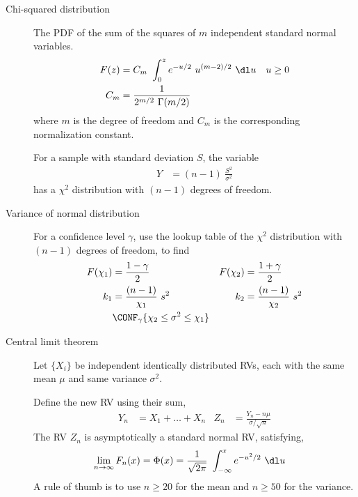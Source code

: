 \begin{description}
    \item[Chi-squared distribution] The PDF of the sum of the squares of $ m $
          independent standard normal variables.
          \begin{align}
              F(z) & = C_m\ \int_{0}^{z} e^{-u/2}\ u^{(m-2)/2}\ \dl u &
              u    & \geq 0                                             \\
              C_m  & = \frac{1}{2^{m/2}\ \Gamma(m/2)}
          \end{align}
          where $ m $ is the degree of freedom and $ C_m $ is the corresponding
          normalization constant. \par
          For a sample with standard deviation $ S $, the variable
          \begin{align}
              Y & = (n-1)\ \frac{S^2}{\sigma^2}
          \end{align}
          has a $ \chi^2 $ distribution with $ (n-1) $ degrees of freedom.

    \item[Variance of normal distribution] For a confidence level $ \gamma $, use the
          lookup table of the $ \chi^2 $ distribution with $ (n-1) $ degrees of freedom,
          to find
          \begin{align}
              F(\chi_1) & = \frac{1-\gamma}{2}                             &
              F(\chi_2) & = \frac{1+\gamma}{2}                               \\
              k_1       & = \frac{(n-1)}{\chi_1}\ s^2                      &
              k_2       & = \frac{(n-1)}{\chi_2}\ s^2                        \\
                        & \CONF_\gamma\{\chi_2 \leq \sigma^2 \leq \chi_1\}
          \end{align}

    \item[Central limit theorem] Let $ \{X_i\} $ be independent identically distributed
          RVs, each with the same mean $ \mu $ and same variance $ \sigma^2 $. \par
          Define the new RV using their sum,
          \begin{align}
              Y_n & = X_1 + \dots + X_n                    &
              Z_n & = \frac{Y_n - n\mu}{\sigma / \sqrt{n}}
          \end{align}
          The RV $ Z_n $ is asymptotically a standard normal RV, satisfying,
          \begin{align}
              \lim_{n \to \infty} F_n(x) & = \Phi(x) = \frac{1}{\sqrt{2\pi}}
              \ \int_{-\infty}^{x} e^{-u^2/2}\ \dl u
          \end{align}
          A rule of thumb is to use $ n \geq 20 $ for the mean and $ n \geq 50 $ for
          the variance.

\end{description}

